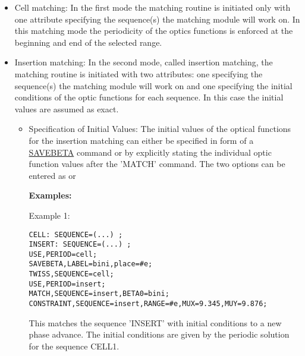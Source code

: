 \begin{itemize}
  \item Cell matching:
    In the first mode the matching routine is initiated only with one
    attribute specifying the sequence(s) the matching module will work
    on. In this matching mode the periodicity of the optics functions is
    enforced at the beginning and end of the selected range. 
    
  \item Insertion matching:
    In the second mode, called insertion matching, the matching routine is
    initiated with two attributes: one specifying the sequence(s) the
    matching module will work on and one specifying the initial conditions
    of the optic functions for each sequence. In this case the initial
    values are assumed as exact. 
 
    \begin{itemize}
      \item Specification of Initial Values: The initial values of the optical
        functions  for the insertion matching can either be specified in form of
        a \href{../control/general.html#savebeta}{SAVEBETA} command or by
        explicitly stating the individual optic function values after the
        'MATCH' command. The two options can be entered as         
        or

{\bf Examples:}
 
Example 1:
\begin{verbatim}
CELL: SEQUENCE=(...) ;
INSERT: SEQUENCE=(...) ;
USE,PERIOD=cell;
SAVEBETA,LABEL=bini,place=#e;
TWISS,SEQUENCE=cell;
USE,PERIOD=insert;
MATCH,SEQUENCE=insert,BETA0=bini;
CONSTRAINT,SEQUENCE=insert,RANGE=#e,MUX=9.345,MUY=9.876;
\end{verbatim}
This matches the sequence 'INSERT' with initial conditions to a new
phase advance. The initial conditions are given by the periodic solution
for the sequence CELL1. 


\end{itemize}
\end{itemize}
